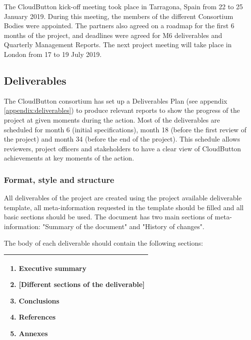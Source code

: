 \documentclass[a4paper,11pt]{article}
\begin{document}
The CloudButton kick-off meeting took place in Tarragona, Spain from 22 to 25 January 2019. During this meeting, the members of the different Consortium Bodies were appointed. The partners also agreed on a roadmap for the first 6 months of the project, and deadlines were agreed for M6 deliverables and Quarterly Management Reports. The next project meeting will take place in London from 17 to 19 July 2019.

\subsection{Deliverables}

The CloudButton consortium has set up a Deliverables Plan (see appendix \ref{appendix:deliverables}) to produce relevant reports to show the progress of the project at given moments during the action. Most of the deliverables are scheduled for month 6 (initial specifications), month 18 (before the first review of the project) and month 34 (before the end of the project). This schedule allows reviewers, project officers and stakeholders to have a clear view of CloudButton achievements at key moments of the action.

\subsubsection{Format, style and structure}

All deliverables of the project are created using the project available deliverable template, all meta-information requested in the template should be filled and all basic sections should be used. The document has two main sections of meta-information: "Summary of the document" and "History of changes".

\bigskip
The body of each deliverable should contain the following sections:


\bigskip
{
\def\arraystretch{1.0}

\begin{tabular}{| p{8cm} |}
\hline
\rowcolor[gray]{0.8}
\begin{enumerate}
    \item Executive summary
    \item {[Different sections of the deliverable]}
    \item Conclusions
    \item References
    \item Annexes
\end{enumerate}\\ \hline
\end{tabular}
}
\bigskip
\end{document}
